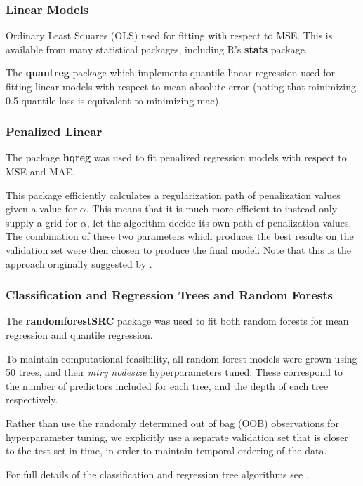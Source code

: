 \documentclass[11pt, a4paper, table]{article}
\begin{document}
\subsubsection{Linear Models}

Ordinary Least Squares (OLS) used for fitting with respect to MSE. This is available from many statistical packages, including R's \textbf{stats} package.

The \textbf{quantreg} package which implements quantile linear regression used for fitting linear models with respect to mean absolute error (noting that minimizing 0.5 quantile loss is equivalent to minimizing mae).

\subsubsection{Penalized Linear}

The package \textbf{hqreg} was used to fit penalized regression models with respect to MSE and MAE.

This package efficiently calculates a regularization path of penalization values given a value for $\alpha$. This means that it is much more efficient to instead only supply a grid for $\alpha$, let the algorithm decide its own path of penalization values. The combination of these two parameters which produces the best results on the validation set were then chosen to produce the final model. Note that this is the approach originally suggested by \cite{zou_regularization_2005}.

\subsubsection{Classification and Regression Trees and Random Forests}

The \textbf{randomforestSRC} package was used to fit both random forests for mean regression and quantile regression.

To maintain computational feasibility, all random forest models were grown using 50 trees, and their \textit{mtry} \textit{nodesize} hyperparameters tuned. These correspond to the number of predictors included for each tree, and the depth of each tree respectively. 

Rather than use the randomly determined out of bag (OOB) observations for hyperparameter tuning, we explicitly use a separate validation set that is closer to the test set in time, in order to maintain temporal ordering of the data.

For full details of the classification and regression tree algorithms see \cite{breiman_classification_1984}. 
\end{document}
